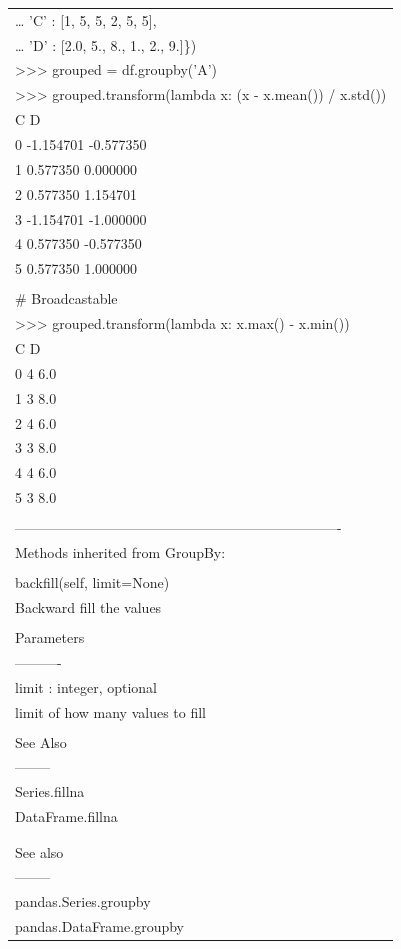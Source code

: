 \documentclass[11pt]{article}
\begin{document}
\begin{enumerate}
\begin{enumerate}
\begin{enumerate}
\begin{center}
\begin{tabular}{l}
\ldots{}                    'C' : [1, 5, 5, 2, 5, 5],\\
\ldots{}                    'D' : [2.0, 5., 8., 1., 2., 9.]\})\\
>>> grouped = df.groupby('A')\\
>>> grouped.transform(lambda x: (x - x.mean()) / x.std())\\
C         D\\
0 -1.154701 -0.577350\\
1  0.577350  0.000000\\
2  0.577350  1.154701\\
3 -1.154701 -1.000000\\
4  0.577350 -0.577350\\
5  0.577350  1.000000\\
\\
\# Broadcastable\\
>>> grouped.transform(lambda x: x.max() - x.min())\\
C    D\\
0  4  6.0\\
1  3  8.0\\
2  4  6.0\\
3  3  8.0\\
4  4  6.0\\
5  3  8.0\\
\\
----------------------------------------------------------------------\\
Methods inherited from GroupBy:\\
\\
backfill(self, limit=None)\\
Backward fill the values\\
\\
Parameters\\
----------\\
limit : integer, optional\\
limit of how many values to fill\\
\\
See Also\\
--------\\
Series.fillna\\
DataFrame.fillna\\
\\
\\
See also\\
--------\\
pandas.Series.groupby\\
pandas.DataFrame.groupby\\

\end{tabular}
\end{center}
\end{enumerate}
\end{enumerate}
\end{enumerate}
\end{document}

